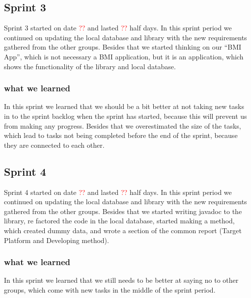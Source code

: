 \subsection{Sprint 3}
Sprint 3 started on date \textcolor{red}{??} and lasted \textcolor{red}{??} half days. In this sprint period we continued on updating the local database and library with the new requirements gathered from the other groups. Besides that we started thinking on our "`BMI App"', which is not necessary a BMI application, but it is an application, which shows the functionality of the library and local database.

\subsubsection{what we learned}
In this sprint we learned that we should be a bit better at not taking new tasks in to the sprint backlog when the sprint has started, because this will prevent us from making any progress. Besides that we overestimated the size of the tasks, which lead to tasks not being completed before the end of the sprint, because they are connected to each other.

\subsection{Sprint 4}
Sprint 4 started on date \textcolor{red}{??} and lasted \textcolor{red}{??} half days. In this sprint period we continued on updating the local database and library with the new requirements gathered from the other groups. Besides that we started writing javadoc to the library, re factored the code in the local database, started making a method, which created dummy data, and wrote a section of the common report (Target Platform and Developing method).

\subsubsection{what we learned}
In this sprint we learned that we still needs to be better at saying no to other groups, which come with new tasks in the middle of the sprint period.